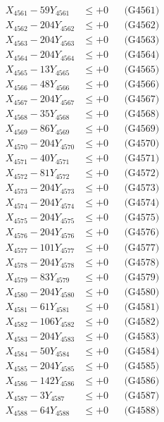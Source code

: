 \documentclass[a4paper,10pt]{article}
\begin{document}
{\begin{align}
\allowbreak
X_{4561} - 59Y_{4561} &\leq +0 && \text{(G4561)} \\
X_{4562} - 204Y_{4562} &\leq +0 && \text{(G4562)} \\
X_{4563} - 204Y_{4563} &\leq +0 && \text{(G4563)} \\
X_{4564} - 204Y_{4564} &\leq +0 && \text{(G4564)} \\
X_{4565} - 13Y_{4565} &\leq +0 && \text{(G4565)} \\
X_{4566} - 48Y_{4566} &\leq +0 && \text{(G4566)} \\
X_{4567} - 204Y_{4567} &\leq +0 && \text{(G4567)} \\
X_{4568} - 35Y_{4568} &\leq +0 && \text{(G4568)} \\
X_{4569} - 86Y_{4569} &\leq +0 && \text{(G4569)} \\
X_{4570} - 204Y_{4570} &\leq +0 && \text{(G4570)} \\
\allowbreak
X_{4571} - 40Y_{4571} &\leq +0 && \text{(G4571)} \\
X_{4572} - 81Y_{4572} &\leq +0 && \text{(G4572)} \\
X_{4573} - 204Y_{4573} &\leq +0 && \text{(G4573)} \\
X_{4574} - 204Y_{4574} &\leq +0 && \text{(G4574)} \\
X_{4575} - 204Y_{4575} &\leq +0 && \text{(G4575)} \\
X_{4576} - 204Y_{4576} &\leq +0 && \text{(G4576)} \\
X_{4577} - 101Y_{4577} &\leq +0 && \text{(G4577)} \\
X_{4578} - 204Y_{4578} &\leq +0 && \text{(G4578)} \\
X_{4579} - 83Y_{4579} &\leq +0 && \text{(G4579)} \\
X_{4580} - 204Y_{4580} &\leq +0 && \text{(G4580)} \\
\allowbreak
X_{4581} - 61Y_{4581} &\leq +0 && \text{(G4581)} \\
X_{4582} - 106Y_{4582} &\leq +0 && \text{(G4582)} \\
X_{4583} - 204Y_{4583} &\leq +0 && \text{(G4583)} \\
X_{4584} - 50Y_{4584} &\leq +0 && \text{(G4584)} \\
X_{4585} - 204Y_{4585} &\leq +0 && \text{(G4585)} \\
X_{4586} - 142Y_{4586} &\leq +0 && \text{(G4586)} \\
X_{4587} - 3Y_{4587} &\leq +0 && \text{(G4587)} \\
X_{4588} - 64Y_{4588} &\leq +0 && \text{(G4588)} \\

\end{align}}
\end{document}
